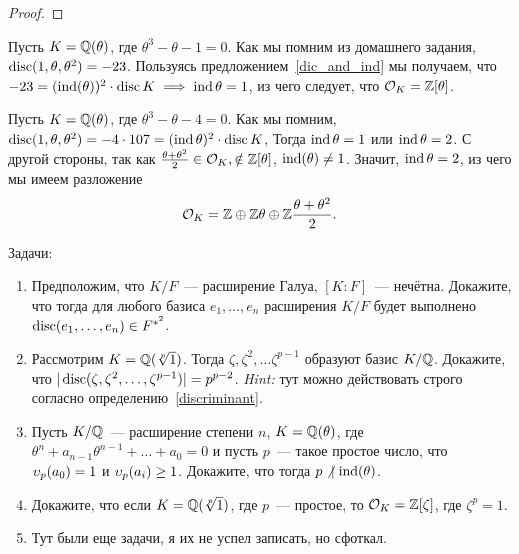 \begin{definition}
\begin{proof}
		\end{proof}

		\begin{example}
			Пусть $K = \mathbb{Q}(\theta)$, где $\theta^3 - \theta - 1 = 0$. Как мы помним из домашнего задания, $\operatorname{disc}(1, \theta, \theta^2) = -23$.  Пользуясь предложением~\ref{dic_and_ind} мы получаем, что $-23 = (\operatorname{ind}(\theta))^2 \cdot \operatorname{disc}{K} \implies \operatorname{ind}{\theta} = 1$, из чего следует, что $\mathcal{O}_{K} = \mathbb{Z}[\theta]$.
		\end{example}

		\begin{example}
			Пусть $K = \mathbb{Q}(\theta)$, где $\theta^3 - \theta - 4 = 0$. Как мы помним, $\operatorname{disc}(1, \theta, \theta^2) = -4 \cdot 107 = (\operatorname{ind}{\theta})^2 \cdot \operatorname{disc}{K}$, Тогда $\operatorname{ind}{\theta} = 1$ или $\operatorname{ind}{\theta} = 2$. С другой стороны, так как $\frac{\theta + \theta^2}{2} \in \mathcal{O}_{K}, \notin \mathbb{Z}[\theta]$, $\operatorname{ind}(\theta) \neq 1$. Значит, $\operatorname{ind}{\theta} = 2$,  из чего мы имеем разложение 
			\[
				\mathcal{O}_{K} = \mathbb{Z} \oplus \mathbb{Z}\theta \oplus \mathbb{Z} \frac{\theta + \theta^2}{2}.
			\]
		\end{example}

		\begin{homework}
			Задачи:
			\begin{enumerate}
				\item Предположим, что $K/F$~--- расширение Галуа, $[K : F]$~--- нечётна. Докажите, что тогда 
				для любого базиса $e_1, \ldots, e_n$ расширения $K/F$ будет выполнено $\operatorname{disc}(e_1, \ldots, e_n) \in F^{*^{2}}$.

				\item Рассмотрим $K = \mathbb{Q}(\sqrt[p]{1})$. Тогда $\zeta, \zeta^2, \ldots \zeta^{p - 1}$ образуют базис $K/\mathbb{Q}$. Докажите, что $|\operatorname{disc}(\zeta, \zeta^2, \ldots, \zeta^{p - 1})| = p^{p - 2}$.
				\emph{Hint:} тут можно действовать строго согласно определению~\ref{discriminant}.

				\item Пусть $K/\mathbb{Q}$~--- расширение степени $n$, $K = \mathbb{Q}(\theta)$, где $\theta^n + a_{n - 1}\theta^{n - 1} + \ldots + a_0 = 0$ и пусть $p$~--- такое простое число, что $\upsilon_{p}(a_0) = 1$ и $\upsilon_{p}(a_i) \ge 1$. Докажите, что тогда $p \not \ \mid \operatorname{ind}(\theta)$.

				\item Докажите, что если $K = \mathbb{Q}(\sqrt[p]{1})$, где $p$~--- простое, то $\mathcal{O}_{K} = \mathbb{Z}[\zeta]$, где $\zeta^p = 1$.

				\item Тут были еще задачи, я их не успел записать, но сфоткал. 
			\end{enumerate}


\end{homework}
\end{definition}
